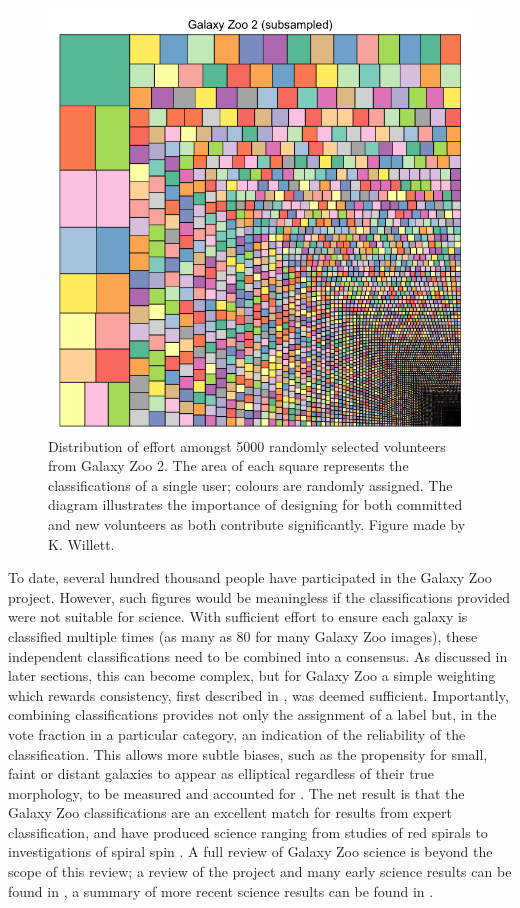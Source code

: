 \documentclass{ar2e}
\begin{document}
\begin{figure}[!ht]
\centering\includegraphics[width=\linewidth]{figs/gz2squares.png}
\caption{Distribution of effort amongst 5000 randomly selected volunteers from
Galaxy Zoo 2. The area of each square represents the classifications of a single
user; colours are randomly assigned. The diagram illustrates the importance of
designing for both committed and new volunteers as both contribute
significantly. Figure made by K. Willett.}
\label{fig:gz2}
\end{figure}


To date, several hundred thousand people 
have participated in the Galaxy Zoo project. However, such
figures would be meaningless if the classifications provided were not suitable
for science. With sufficient effort to ensure each galaxy is classified multiple
times (as many as 80 for many Galaxy Zoo images), these independent
classifications need to be combined into a consensus. As discussed in later
sections, this can become complex, but for Galaxy Zoo a simple weighting which
rewards consistency, first described in \citet{Land++2008}, was deemed sufficient.
Importantly, combining classifications provides not only the assignment of a
label but, in the vote fraction in a particular category, an indication of the
reliability of the classification. This allows more subtle biases, such as the
propensity for small, faint or distant galaxies to appear as elliptical
regardless of their true morphology, to be measured and accounted for
\citep[see][]{Bamford++2009}. The net result is that the Galaxy Zoo classifications
are an excellent match for results from expert classification, and have produced
science ranging from studies of red spirals \citep{Masters++2010} to investigations
of spiral spin \citep{Slosar++2009}.
A full review of Galaxy Zoo science is beyond the scope of this review; a review
of the project and many early science results can be found in
\citet{Fortson++2012}, a summary of more recent science results can be found in
\citet{Willett++2013}.
\end{document}

